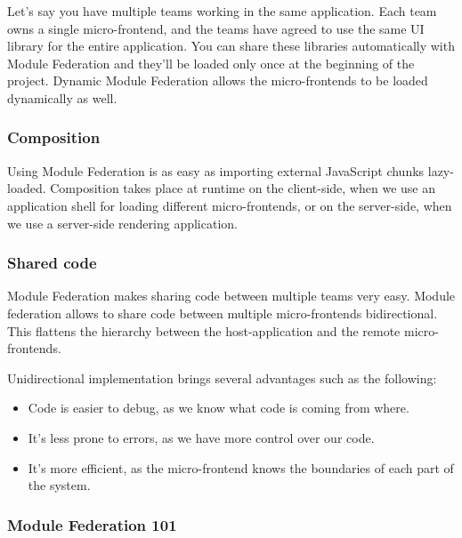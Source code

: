 Let's say you have multiple teams working in the same application. Each team owns a single micro-frontend, and the teams have agreed to use the same UI library for the entire application. You can share these libraries automatically with Module Federation and they'll be loaded only once at the beginning of the project. Dynamic Module Federation allows the micro-frontends to be loaded dynamically as well. \cite[83]{book:2021:mezzalira:applied-methods:building-micro-frontends}

\subsubsection{Composition}

Using Module Federation is as easy as importing external JavaScript chunks lazy-loaded. Composition takes place at runtime on the client-side, when we use an application shell for loading different micro-frontends, or on the server-side, when we use a server-side rendering application. \cite[84]{book:2021:mezzalira:applied-methods:building-micro-frontends}

\subsubsection{Shared code}

Module Federation makes sharing code between multiple teams very easy. Module federation allows to share code between multiple micro-frontends bidirectional. This flattens the hierarchy between the host-application and the remote micro-frontends. 

Unidirectional implementation brings several advantages such as the following: \cite[84]{book:2021:mezzalira:applied-methods:building-micro-frontends}

\begin{itemize}
  \item Code is easier to debug, as we know what code is coming from where.
  \item It's less prone to errors, as we have more control over our code.
  \item It's more efficient, as the micro-frontend knows the boundaries of each part of the system.
\end{itemize}

\subsubsection{Module Federation 101}

